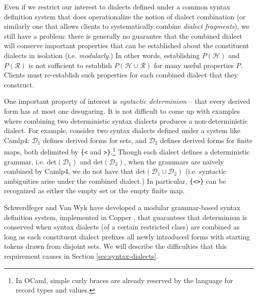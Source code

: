 Even if we restrict our interest  to dialects defined under a common syntax definition system that does operationalize the notion of dialect combination (or similarly one that allows clients to systematically combine \emph{dialect fragments}), we still have a problem: there is generally no guarantee that the combined dialect will conserve important properties that can be established about the constituent dialects in isolation (i.e. \emph{modularly}.) In other words, establishing $P(\mathcal{H})$ and $P(\mathcal{R})$ is not sufficient to establish $P(\mathcal{H} \cup \mathcal{R})$ for many useful properties $P$. Clients must re-establish such properties for each combined dialect that they construct.%

One important property of interest is \emph{syntactic determinism} -- that every derived form has at most one desugaring. It is not difficult to come up with examples where combining two deterministic syntax dialects produces a non-deterministic dialect. For example, consider two syntax dialects defined under a system like Camlp4: $\mathcal{D}_1$ defines derived forms for sets, and $\mathcal{D}_2$ defines derived forms for finite maps, both delimited by \verb~{<~ and \verb~>}~.\footnote{In OCaml, simple curly braces are already reserved by the language for record types and values.} Though each dialect defines a deterministic grammar, i.e. $\mathrm{det}(\mathcal{D}_1)$ and $\mathrm{det}(\mathcal{D}_2)$, when the grammars are na\"ively combined by Camlp4, we do not have that $\mathrm{det}(\mathcal{D}_1 \cup \mathcal{D}_2)$ (i.e. syntactic ambiguities arise under the combined dialect.) In particular, \verb~{<>}~ can be recognized as either the empty set or the empty finite map. %

Schwerdfeger and Van Wyk have developed a modular grammar-based syntax definition system, implemented in Copper \cite{conf/gpce/WykS07}, that guarantees that determinism is conserved when syntax dialects (of a certain restricted class) are combined \cite{conf/pldi/SchwerdfegerW09} as long as each constituent dialect prefixes all newly introduced forms with starting tokens drawn from disjoint sets. We will describe the difficulties that this requirement causes in Section \ref{sec:syntax-dialects}.


